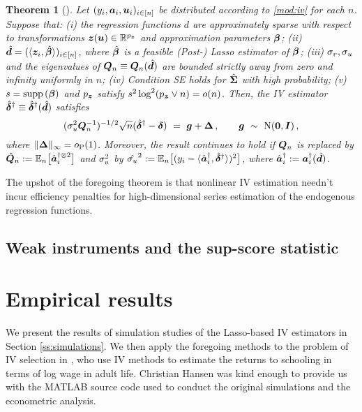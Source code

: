 \documentclass{uwstat572}
\newcommand{\benn}{\begin{equation*}}
\newcommand{\eenn}{\end{equation*}}
\newtheorem{thm}{Theorem}[section]
\theoremstyle{definition}
\theoremstyle{remark}
\newcommand{\R}{\ensuremath{\mathbb{R}}}
\newcommand{\Id}{\bs{I}}
\newcommand{\supp}{\mathrm{supp} \,}
\newcommand{\Prb}{\mathrm{P}}
\newcommand{\Ex}{\mathbb{E}}
\newcommand{\Exn}{\Ex_n}
\newcommand{\Normal}{\mathrm{N}}
\newcommand{\bs}[1]{\boldsymbol{#1}}
\numberwithin{equation}{section}
\begin{document}
\begin{thm}[{\cite[Theorem 3]{BCH11}}]\label{thm:3}
Let $(y_i, \a_i, \u_i)_{i\inn}$ be distributed according to \eqref{mod:iv} for each $n$. Suppose that: (i) the regression functions $d$ are approximately sparse with respect to transformations $\z(\u) \in \R^{\pz}$ and approximation parameters $\regb$; (ii) $\dhat = (\langle \z_i,\regbh\rangle)_{i\inn}$, where $\regbh$ is a feasible (Post-) Lasso estimator of $\regb$; (iii) $\sigma_v, \sigma_u$ and the eigenvalues of $\Qn \equiv \Qn(\dhat)$ are bounded strictly away from zero and infinity uniformly in $n$; (iv) Condition SE holds for $\gramhat$ with high probability; (v) $s = \supp(\regb)$ and $\pz$ satisfy $\sb^2\log^2(\pz\vee n) = o(n)$. Then, the IV estimator $\rdiv \equiv \rdiv(\dhat)$ satisfies
\benn
	(\sds^2\Qn^{-1})^{-1/2} \sqrt{n}(\rdiv-\rd) \ = \ \g + \rm\,, \qquad \g \ \sim \ \Normal(\bs{0}, \Id) \,,
\eenn
where $\|\rm\|_\infty = o_\Prb(1)$. Moreover, the result continues to hold if $\Qn$ is replaced by $\Qnhat := \Exn\big[\ainstihatkpt\big]$ and $\sigma_u^2$ by $\sdshat^2 := \Exn\big[(y_i -\langle \ainstihat, \rdiv\rangle)^2\big]$, where $\ainstihat := \ainsti(\dhat)$. 
\end{thm}

The upshot of the foregoing theorem is that nonlinear IV estimation needn't incur efficiency penalties for high-dimensional series estimation of the endogenous regression functions. 


%
\subsection{Weak instruments and the sup-score statistic}\label{ss:supscore}


%
\section{Empirical results}\label{s:results}

We present the results of simulation studies of the Lasso-based IV estimators in Section \ref{ss:simulations}. We then apply the foregoing methods to the problem of IV selection in \cite{AK91}, who use IV methods to estimate the returns to schooling in terms of log wage in adult life. Christian Hansen was kind enough to provide us with the MATLAB source code used to conduct the original simulations and the econometric analysis. 
\end{document}
